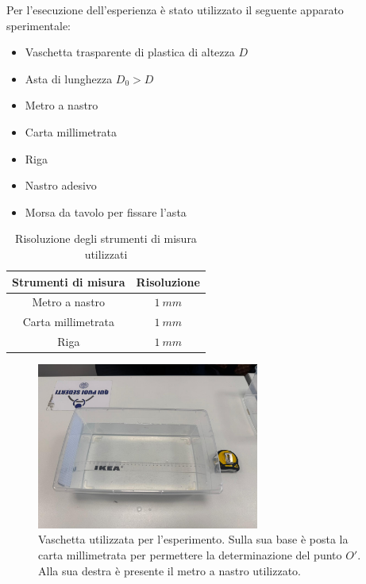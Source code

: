 Per l'esecuzione dell'esperienza è stato utilizzato il seguente apparato sperimentale:
\begin{itemize}
	\item Vaschetta trasparente di plastica di altezza $D$
	\item Asta di lunghezza $D_0>D$
	\item Metro a nastro
	\item Carta millimetrata
	\item Riga
	\item Nastro adesivo
	\item Morsa da tavolo per fissare l'asta 
\end{itemize}


\begin{table}[H]
	\centering
	\begin{tabular}{|c|c|}
		\hline
		\textbf{Strumenti di misura} & \textbf{Risoluzione} \\
		\hline
		Metro a nastro & $1\ mm$ \\
		Carta millimetrata & $1\ mm$ \\
		Riga & $1\ mm$ \\
		\hline
	\end{tabular}
	\caption{Risoluzione degli strumenti di misura utilizzati}
	\label{tab:}
\end{table}


\begin{figure}[H]
	\centering
	\includegraphics[width=0.65\textwidth]{./figures/vaschettaemetro}
	\caption{Vaschetta utilizzata per l'esperimento. Sulla sua base è posta la carta millimetrata per permettere la determinazione del punto $O'$. Alla sua destra è presente il metro a nastro utilizzato.}
\end{figure}

